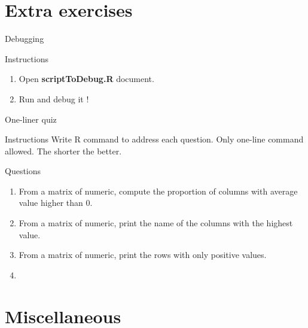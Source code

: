 \documentclass[10pt]{beamer}
\begin{document}


\section{Extra exercises}

\begin{frame}{Debugging}
  \begin{block}{Instructions}
    \begin{enumerate}
    \item Open {\bf scriptToDebug.R} document.
    \item Run and debug it !
    \end{enumerate}
  \end{block}
\end{frame}


\begin{frame}{One-liner quiz}
  \begin{block}{Instructions}
    Write R command to address each question. Only one-line command allowed. The shorter the better.
  \end{block}
  \begin{block}{Questions}
    \begin{enumerate}
    \item From a matrix of numeric, compute the proportion of columns with average value higher than 0.
    \item From a matrix of numeric, print the name of the columns with the highest value.
    \item From a matrix of numeric, print the rows with only positive values.
    \item 
    \end{enumerate}
  \end{block}
\end{frame}

\section{Miscellaneous}
\end{document}
